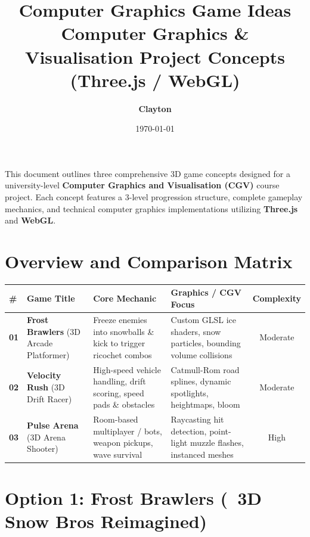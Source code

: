 \documentclass[11pt,a4paper]{article}
\title{\vspace{-2em}\textbf{\LARGE Computer Graphics Game Ideas}\\[0.3em] \large Computer Graphics \& Visualisation Project Concepts (Three.js / WebGL)}
\author{\textbf{Clayton}}
\date{\vspace{-0.5em}\today}
\begin{document}
\maketitle

\vspace{-1em}
\noindent\hrulefill
\vspace{1em}

\noindent This document outlines three comprehensive 3D game concepts designed for a university-level \textbf{Computer Graphics and Visualisation (CGV)} course project. Each concept features a 3-level progression structure, complete gameplay mechanics, and technical computer graphics implementations utilizing \textbf{Three.js} and \textbf{WebGL}.

\section{Overview and Comparison Matrix}

\begin{table}[h!]
\centering
\small
\begin{tabularx}{\textwidth}{l p{3.2cm} p{4.2cm} p{4.5cm} c}
\toprule
\textbf{\#} & \textbf{Game Title} & \textbf{Core Mechanic} & \textbf{Graphics / CGV Focus} & \textbf{Complexity} \\
\midrule
\textbf{01} & \textbf{Frost Brawlers} \newline \footnotesize (3D Arcade Platformer) & Freeze enemies into snowballs \& kick to trigger ricochet combos & Custom GLSL ice shaders, snow particles, bounding volume collisions & Moderate \\
\addlinespace
\textbf{02} & \textbf{Velocity Rush} \newline \footnotesize (3D Drift Racer) & High-speed vehicle handling, drift scoring, speed pads \& obstacles & Catmull-Rom road splines, dynamic spotlights, heightmaps, bloom & Moderate \\
\addlinespace
\textbf{03} & \textbf{Pulse Arena} \newline \footnotesize (3D Arena Shooter) & Room-based multiplayer / bots, weapon pickups, wave survival & Raycasting hit detection, point-light muzzle flashes, instanced meshes & High \\
\bottomrule
\end{tabularx}
\end{table}

\section{Option 1: Frost Brawlers (\faSnowflake\ 3D Snow Bros Reimagined)}
\end{document}
